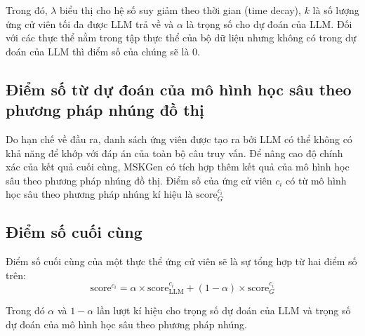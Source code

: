 Trong đó, $\lambda$ biểu thị cho hệ số suy giảm theo thời gian (time decay), $k$ là số lượng ứng cử viên tối đa được LLM trả về và $\alpha$ là trọng số cho dự đoán của LLM. Đối với các thực thể nằm trong tập thực thể của bộ dữ liệu nhưng không có trong dự đoán của LLM thì điểm số của chúng sẽ là 0.

\vspace{1em}
\subsection{Điểm số từ dự đoán của mô hình học sâu theo phương pháp nhúng đồ thị}

Do hạn chế về đầu ra, danh sách ứng viên được tạo ra bởi LLM có thể không có khả năng để khớp với đáp án của toàn bộ câu truy vấn. Để nâng cao độ chính xác của kết quả cuối cùng, MSKGen có tích hợp thêm kết quả của mô hình học sâu theo phương pháp nhúng đồ thị. Điểm số của ứng cử viên $c_i$ có từ mô hình học sâu theo phương pháp nhúng kí hiệu là $\text{score}_G^{c_i}$

\vspace{1em}
\subsection{Điểm số cuối cùng}

Điểm số cuối cùng của một thực thể ứng cử viên sẽ là sự tổng hợp từ hai điểm số trên:
\begin{equation}
    \label{eq:final-score}
    \text{score}^{c_i} = \alpha \times \text{score}^{c_i}_{\text{LLM}} + (1 - \alpha) \times \text{score}_G^{c_i}
    \tag{x}
\end{equation}

Trong đó $\alpha$ và $1 - \alpha$ lần lượt kí hiệu cho trọng số dự đoán của LLM và trọng số dự đoán của mô hình học sâu theo phương pháp nhúng.

